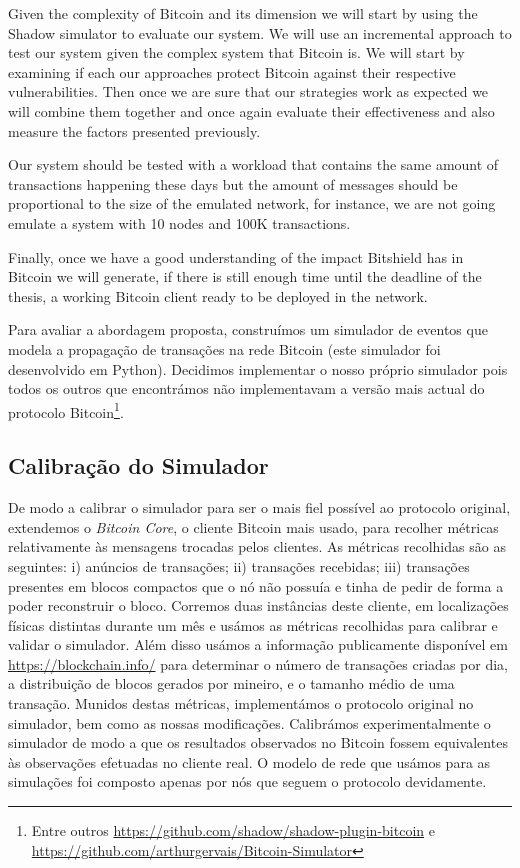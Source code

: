 Given the complexity of Bitcoin and its dimension we will start by using the Shadow simulator \cite{jansen2011shadow} to evaluate our system. We will use an incremental approach to test our system given the complex system that Bitcoin is. We will start by examining if each our approaches protect Bitcoin against their respective vulnerabilities. Then once we are sure that our strategies work as expected we will combine them together and once again evaluate their effectiveness and also measure the factors presented previously. 

Our system should be tested with a workload that contains the same amount of transactions happening these days but the amount of messages should be proportional to the size of the emulated network, for instance, we are not going emulate a system with 10 nodes and 100K transactions.

Finally, once we have a good understanding of the impact Bitshield has in Bitcoin we will generate, if there is still enough time until the deadline of the thesis, a working Bitcoin client ready to be deployed in the network.

Para avaliar a abordagem proposta, construímos um simulador de eventos que modela a propagação de transações na rede Bitcoin (este simulador foi desenvolvido em Python). Decidimos implementar o nosso próprio simulador pois todos os outros que encontrámos não implementavam a versão mais actual do protocolo Bitcoin\footnote{Entre outros \url{https://github.com/shadow/shadow-plugin-bitcoin} e\\ \url{https://github.com/arthurgervais/Bitcoin-Simulator}}. 

\subsection{Calibração do Simulador}
\label{sec:calibracao}
De modo a calibrar o simulador para ser o mais fiel possível ao protocolo original, extendemos o \textit{Bitcoin Core}, o cliente Bitcoin mais usado, para recolher métricas relativamente às mensagens trocadas pelos clientes.
As métricas recolhidas são as seguintes: i) anúncios de transações; ii) transações recebidas; iii) transações presentes em blocos compactos que o nó não possuía e tinha de pedir de forma a poder reconstruir o bloco.
Corremos duas instâncias deste cliente, em localizações físicas distintas durante um mês e usámos as métricas recolhidas para calibrar e validar o simulador.
Além disso usámos a informação publicamente disponível em \url{https://blockchain.info/} para determinar o número de transações criadas por dia, a distribuição de blocos gerados por mineiro, e o tamanho médio de uma transação.
Munidos destas métricas, implementámos o protocolo original no simulador, bem como as nossas modificações. Calibrámos experimentalmente o simulador de modo a que os resultados observados no Bitcoin fossem equivalentes às observações efetuadas no cliente real.
O modelo de rede que usámos para as simulações foi composto apenas por nós que seguem o protocolo devidamente.

